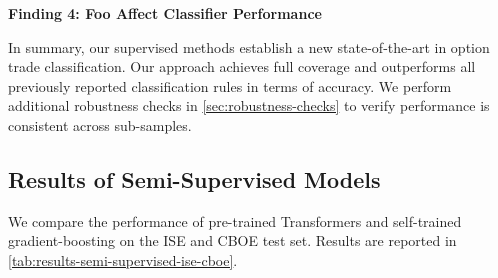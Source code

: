 \textbf{Finding 4: Foo Affect Classifier Performance}



In summary, our supervised methods establish a new state-of-the-art in option trade classification. Our approach achieves full coverage and outperforms all previously reported classification rules in terms of accuracy. We perform additional robustness checks in \cref{sec:robustness-checks} to verify performance is consistent across sub-samples.

\subsection{Results of Semi-Supervised
    Models}\label{sec:results-of-semi-supervised-models}

We compare the performance of pre-trained Transformers and self-trained gradient-boosting on the \gls{ISE} and \gls{CBOE} test set. Results are reported in \cref{tab:results-semi-supervised-ise-cboe}.

